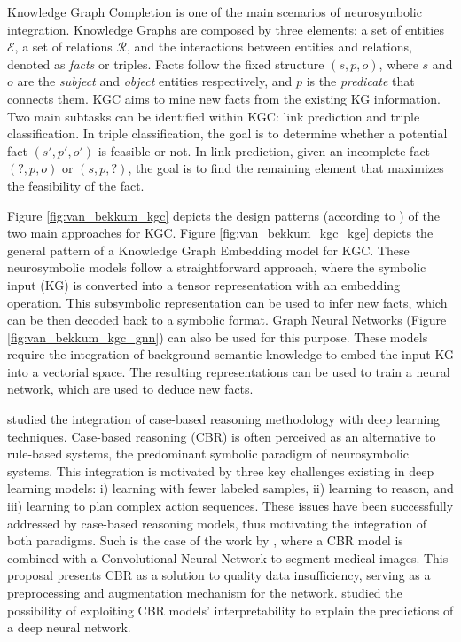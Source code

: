 Knowledge Graph Completion \citep{nickel_review_ml_kg_2016,wang_kge_survey_2017} is one of the main scenarios of neurosymbolic integration. Knowledge Graphs are composed by three elements: a set of entities $\mathcal{E}$, a set of relations $\mathcal{R}$, and the interactions between entities and relations, denoted as \textit{facts} or triples. Facts follow the fixed structure $(s,p,o)$, where $s$ and $o$ are the \textit{subject} and \textit{object} entities respectively, and $p$ is the \textit{predicate} that connects them. KGC aims to mine new facts from the existing KG information. Two main subtasks can be identified within KGC: link prediction and triple classification. In triple classification, the goal is to determine whether a potential fact $(s',p',o')$ is feasible or not. In link prediction, given an incomplete fact $(?,p,o)$ or $(s,p,?)$, the goal is to find the remaining element that maximizes the feasibility of the fact. 

Figure \ref{fig:van_bekkum_kgc} depicts the design patterns (according to \cite{van_bekkum_modular_2021}) of the two main approaches for KGC. Figure \ref{fig:van_bekkum_kgc_kge} depicts the general pattern of a Knowledge Graph Embedding model for KGC. These neurosymbolic models follow a straightforward approach, where the symbolic input (KG) is converted into a tensor representation with an embedding operation. This subsymbolic representation can be used to infer new facts, which can be then decoded back to a symbolic format. Graph Neural Networks (Figure \ref{fig:van_bekkum_kgc_gnn}) can also be used for this purpose. These models require the integration of background semantic knowledge to embed the input KG into a vectorial space. The resulting representations can be used to train a neural network, which are used to deduce new facts.

\cite{leake_bringing_2020} studied the integration of case-based reasoning methodology with deep learning techniques. Case-based reasoning (CBR) is often perceived as an alternative to rule-based systems, the predominant symbolic paradigm of neurosymbolic systems. This integration is motivated by three key challenges existing in deep learning models: i) learning with fewer labeled samples, ii) learning to reason, and iii) learning to plan complex action sequences. These issues have been successfully addressed by case-based reasoning models, thus motivating the integration of both paradigms. Such is the case of the work by \cite{marie_segmentation_2019}, where a CBR model is combined with a Convolutional Neural Network to segment medical images. This proposal presents CBR as a solution to quality data insufficiency, serving as a preprocessing and augmentation mechanism for the network. \cite{lamy_explainable_2019} studied the possibility of exploiting CBR models' interpretability to explain the predictions of a deep neural network.


